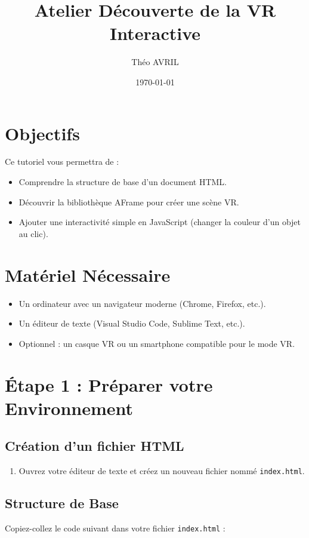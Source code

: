 \documentclass[12pt]{article}
\title{Atelier Découverte de la VR Interactive}
\author{Théo AVRIL}
\date{\today}
\begin{document}
\maketitle

\section{Objectifs}
Ce tutoriel vous permettra de :
\begin{itemize}
    \item Comprendre la structure de base d'un document HTML.
    \item Découvrir la bibliothèque AFrame pour créer une scène VR.
    \item Ajouter une interactivité simple en JavaScript (changer la couleur d'un objet au clic).
\end{itemize}

\section{Matériel Nécessaire}
\begin{itemize}
    \item Un ordinateur avec un navigateur moderne (Chrome, Firefox, etc.).
    \item Un éditeur de texte (Visual Studio Code, Sublime Text, etc.).
    \item Optionnel : un casque VR ou un smartphone compatible pour le mode VR.
\end{itemize}

\section{Étape 1 : Préparer votre Environnement}
\subsection{Création d'un fichier HTML}
\begin{enumerate}
    \item Ouvrez votre éditeur de texte et créez un nouveau fichier nommé \texttt{index.html}.
\end{enumerate}

\subsection{Structure de Base}
Copiez-collez le code suivant dans votre fichier \texttt{index.html} :
\end{document}

